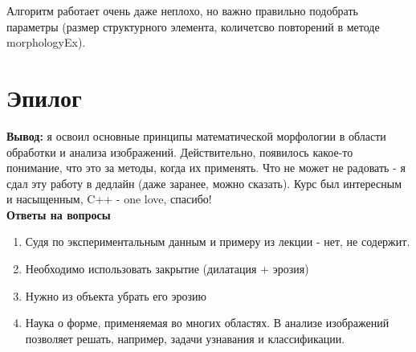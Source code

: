 \noindent Алгоритм работает очень даже неплохо, но важно правильно подобрать параметры (размер структурного элемента, количетсво повторений в методе morphologyEx).
\newpage 
\section{Эпилог}
\noindent \textbf{Вывод:} я освоил основные принципы математической морфологии в области обработки и анализа изображений. Действительно, появилось какое-то понимание, что это за методы, когда их применять. Что не может не радовать - я сдал эту работу в дедлайн (даже заранее, можно сказать). Курс был интересным и насыщенным, C++ - one love, спасибо!
\\
\noindent \textbf{Ответы на вопросы}
\begin{enumerate}
    \item Судя по экспериментальным данным и примеру из лекции - нет, не содержит.
    \item Необходимо использовать закрытие (дилатация + эрозия)
    \item Нужно из объекта убрать его эрозию
    \item Наука о форме, применяемая во многих областях. В анализе изображений позволяет решать, например, задачи узнавания и классификации.
\end{enumerate}
